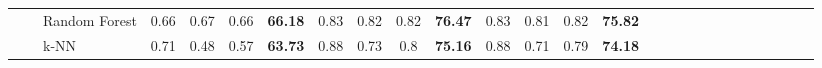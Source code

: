 \documentclass[sn-mathphys]{sn-jnl}%
\theoremstyle{thmstyleone}%
\theoremstyle{thmstyletwo}%
\theoremstyle{thmstylethree}%
\begin{document}
\begin{table*}[hbt!]
{\begin{tabular}{lllcccccccccccccccccccccccc}
\multicolumn{1}{|l|}{}                                  & \multicolumn{1}{l|}{}                                                                                        & \multicolumn{1}{l|}{Random Forest}                        & \multicolumn{1}{c|}{0.66}               & \multicolumn{1}{c|}{0.67}            & \multicolumn{1}{c|}{0.66}              & \multicolumn{1}{c|}{\textbf{66.18}}                                                   & \multicolumn{1}{c|}{0.83}               & \multicolumn{1}{c|}{0.82}            & \multicolumn{1}{c|}{0.82}              & \multicolumn{1}{c|}{\textbf{76.47}}                                                   & \multicolumn{1}{c|}{0.83}               & \multicolumn{1}{c|}{0.81}            & \multicolumn{1}{c|}{0.82}              & \multicolumn{1}{c|}{\textbf{75.82}}                                                   &                      &                      &                      &                      &                      &                      &                      &                      &                      &                      &                      &                      \\ \cline{3-15}
\multicolumn{1}{|l|}{}                                  & \multicolumn{1}{l|}{}                                                                                        & \multicolumn{1}{l|}{k-NN}                                 & \multicolumn{1}{c|}{0.71}               & \multicolumn{1}{c|}{0.48}            & \multicolumn{1}{c|}{0.57}              & \multicolumn{1}{c|}{\textbf{63.73}}                                                   & \multicolumn{1}{c|}{0.88}               & \multicolumn{1}{c|}{0.73}            & \multicolumn{1}{c|}{0.8}               & \multicolumn{1}{c|}{\textbf{75.16}}                                                   & \multicolumn{1}{c|}{0.88}               & \multicolumn{1}{c|}{0.71}            & \multicolumn{1}{c|}{0.79}              & \multicolumn{1}{c|}{\textbf{74.18}}                                                   &                      &                      &                      &                      &                      &                      &                      &                      &                      &                      &                      &                      \\ \cline{2-15}

\end{tabular}}
\end{table*}
\end{document}
